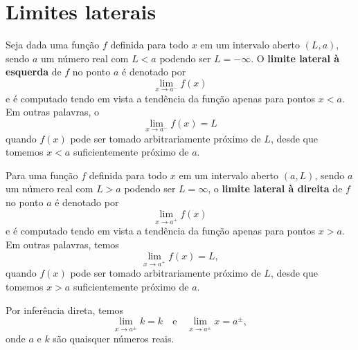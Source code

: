 \section{Limites laterais}\label{cap_lim_sec_lateral}

Seja dada uma função $f$ definida para todo $x$ em um intervalo aberto $(L, a)$, sendo $a$ um número real com $L<a$ podendo ser $L=-\infty$. O {\bf limite lateral à esquerda} de $f$ no ponto $a$ é denotado por
\begin{equation}
  \lim_{x\to a^-} f(x)
\end{equation}
e é computado tendo em vista a tendência da função apenas para pontos $x<a$. Em outras palavras, o
\begin{equation}
  \lim_{x\to a^-} f(x) = L
\end{equation}
quando $f(x)$ pode ser tomado arbitrariamente próximo de $L$, desde que tomemos $x<a$ suficientemente próximo de $a$.

Para uma função $f$ definida para todo $x$ em um intervalo aberto $(a, L)$, sendo $a$ um número real com $L>a$ podendo ser $L=\infty$, o {\bf limite lateral à direita} de $f$ no ponto $a$ é denotado por
\begin{equation}
  \lim_{x\to a^+} f(x)
\end{equation}
e é computado tendo em vista a tendência da função apenas para pontos $x>a$. Em outras palavras, temos
\begin{equation}
  \lim_{x\to a^+} f(x) = L,
\end{equation}
quando $f(x)$ pode ser tomado arbitrariamente próximo de $L$, desde que tomemos $x>a$ suficientemente próximo de $a$.

\begin{obs}
  Por inferência direta, temos
  \begin{equation}
    \lim_{x\to a^{\pm}} k = k\quad\text{e}\quad\lim_{x\to a^{\pm}} x = a^{\pm},
  \end{equation}
  onde $a$ e $k$ são quaisquer números reais.
\end{obs}

